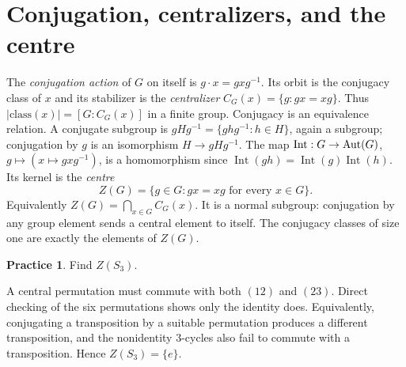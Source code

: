 \documentclass[11pt,openany]{book}
\theoremstyle{definition}
\newtheorem{exercise}[theorem]{Practice}
\begin{document}
\section{Conjugation, centralizers, and the centre}
The \emph{conjugation action} of $G$ on itself is $g\cdot x=gxg^{-1}$. Its orbit is the conjugacy class of $x$ and its stabilizer is the \emph{centralizer} $C_G(x)=\{g:gx=xg\}$. Thus $|\text{class}(x)|=[G:C_G(x)]$ in a finite group. Conjugacy is an equivalence relation. A conjugate subgroup is $gHg^{-1}=\{ghg^{-1}:h\in H\}$, again a subgroup; conjugation by $g$ is an isomorphism $H\to gHg^{-1}$.
The map $\operatorname{Int}:G\to\operatorname{Aut}(G)$, $g\mapsto(x\mapsto gxg^{-1})$, is a homomorphism since $\operatorname{Int}(gh)=\operatorname{Int}(g)\operatorname{Int}(h)$. Its kernel is the \emph{centre}
\[Z(G)=\{g\in G:gx=xg\text{ for every }x\in G\}.\]
Equivalently $Z(G)=\bigcap_{x\in G}C_G(x)$. It is a normal subgroup: conjugation by any group element sends a central element to itself. The conjugacy classes of size one are exactly the elements of $Z(G)$.
\begin{exercise}Find $Z(S_3)$.\end{exercise}
\begin{solution}A central permutation must commute with both $(12)$ and $(23)$. Direct checking of the six permutations shows only the identity does. Equivalently, conjugating a transposition by a suitable permutation produces a different transposition, and the nonidentity $3$-cycles also fail to commute with a transposition. Hence $Z(S_3)=\{e\}$.\end{solution}
\end{document}
